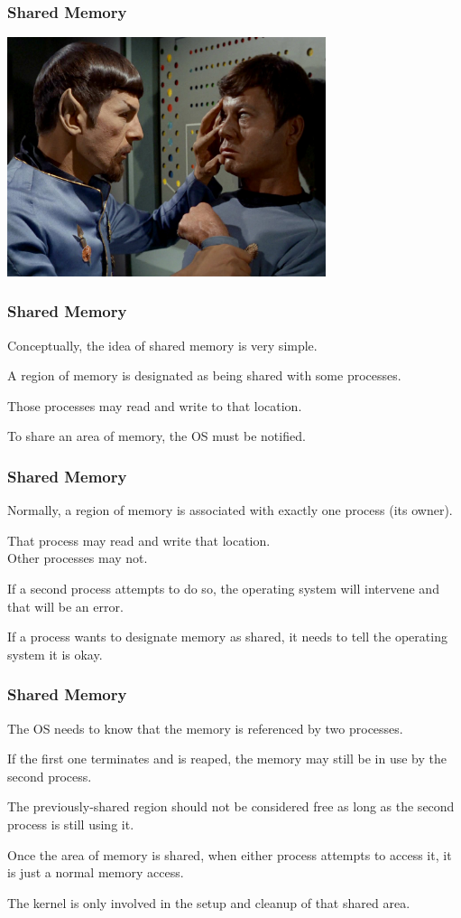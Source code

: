 \begin{frame}
\frametitle{Shared Memory}
\begin{center}
	\includegraphics[width=0.7\textwidth]{images/mindmeld.jpg}
\end{center}

\end{frame}


\begin{frame}
\frametitle{Shared Memory}

Conceptually, the idea of shared memory is very simple. 

A region of memory is designated as being shared with some processes.

Those processes may read and write to that location. 

To share an area of memory, the OS must be notified.

\end{frame}

\begin{frame}
\frametitle{Shared Memory}
Normally, a region of memory is associated with exactly one process (its owner).

That process may read and write that location.\\
\quad Other processes may not. 

If a second process attempts to do so, the operating system will intervene and that will be an error.

 If a process wants to designate memory as shared, it needs to tell the operating system it is okay.

\end{frame}

\begin{frame}
\frametitle{Shared Memory}

The OS needs to know that the memory is referenced by two processes.

If the first one terminates and is reaped, the memory may still be in use by the second process.

The previously-shared region should not be considered free as long as the second process is still using it. 

Once the area of memory is shared, when either process attempts to access it, it is just a normal memory access. 

The kernel is only involved in the setup and cleanup of that shared area.

\end{frame}

